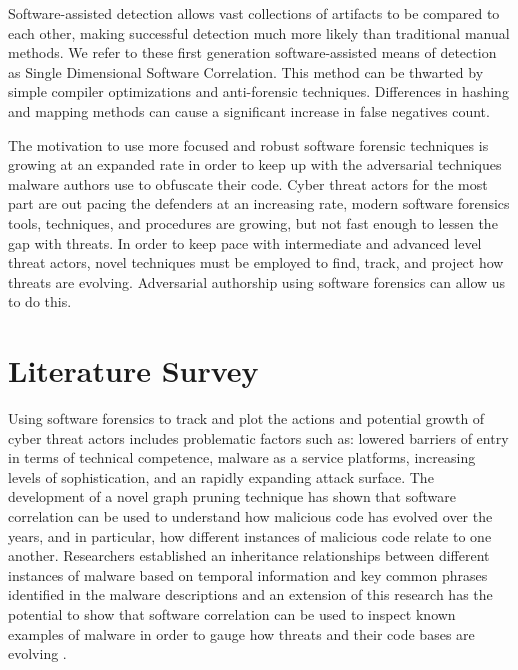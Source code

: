 \documentclass[12pt]{report}
\begin{document}
Software-assisted detection allows vast collections of artifacts to be compared to each other, making successful detection much more likely than traditional manual methods.  We refer to these first generation software-assisted means of detection as Single Dimensional Software Correlation.  This method can be thwarted by simple compiler optimizations and anti-forensic techniques.  Differences in hashing and mapping methods can cause a significant increase in false negatives count.

The motivation to use more focused and robust software forensic techniques is growing at an expanded rate in order to keep up with the adversarial techniques malware authors use to obfuscate their code.  Cyber threat actors for the most part are out pacing the defenders at an increasing rate, modern software forensics tools, techniques, and procedures are growing, but not fast enough to lessen the gap with threats.  In order to keep pace with intermediate and advanced level threat actors, novel techniques must be employed to find, track, and project how threats are evolving.  Adversarial authorship using software forensics can allow us to do this.

\chapter{Literature Survey}
\label{chap:two}
Using software forensics to track and plot the actions and potential growth of cyber threat actors includes problematic factors such as: lowered barriers of entry in terms of technical competence, malware as a service platforms, increasing levels of sophistication, and an rapidly expanding attack surface.  The development of a novel graph pruning technique has shown that software correlation can be used to understand how malicious code has evolved over the years, and in particular, how different instances of malicious code relate to one another.  Researchers established an inheritance relationships between different instances of malware based on temporal information and key common phrases identified in the malware descriptions and an extension of this research has the potential to show that software correlation can be used to inspect known examples of malware in order to gauge how threats and their code bases are evolving \cite{gupta2009empirical}.
\end{document}
